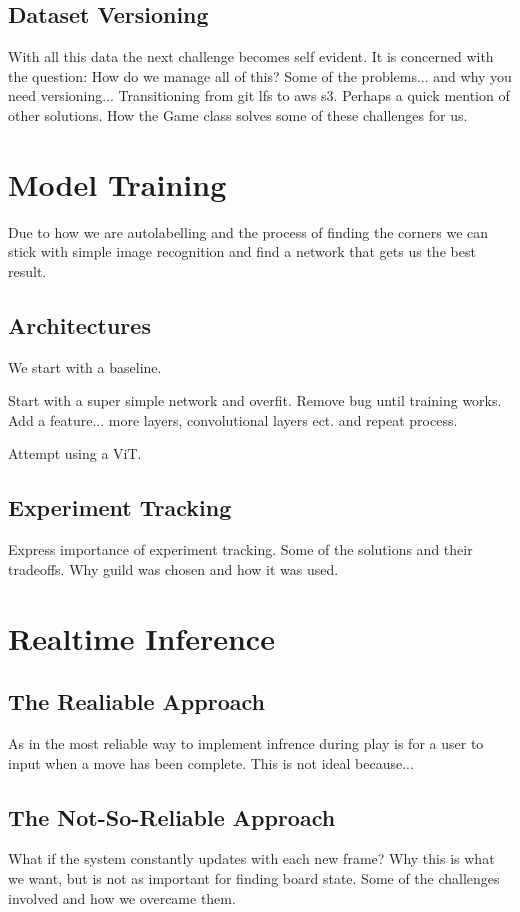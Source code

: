 \subsection{Dataset Versioning}
With all this data the next challenge becomes self evident.
It is concerned with the question: How do we manage all of this?
Some of the problems... and why you need versioning...
Transitioning from git lfs to aws s3.  Perhaps a quick mention of other solutions.
How the Game class solves some of these challenges for us.


\section{Model Training}
Due to how we are autolabelling and the process of finding the corners we can stick with simple
image recognition and find a network that gets us the best result.

\subsection{Architectures}
We start with a baseline.

Start with a super simple network and overfit.  Remove bug until training works.
Add a feature... more layers, convolutional layers ect. and repeat process.

Attempt using a ViT.

\subsection{Experiment Tracking}
Express importance of experiment tracking.  Some of the solutions \cite{} and their tradeoffs.
Why guild was chosen and how it was used.


\section{Realtime Inference}

\subsection{The Realiable Approach}
As in \cite{} the most reliable way to implement infrence during play is for a user to input when a move
has been complete.
This is not ideal because...

\subsection{The Not-So-Reliable Approach}
What if the system constantly updates with each new frame?
Why this is what we want, but is not as important for finding board state.
Some of the challenges involved and how we overcame them.